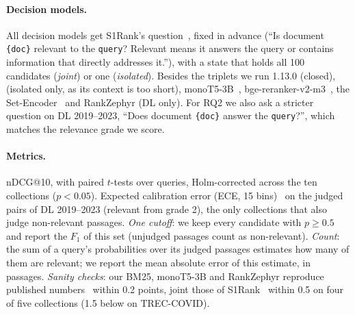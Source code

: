 \paragraph{Decision models.}
All decision models get S1Rank's question~\cite{S1Rank}, fixed in advance (``Is document \texttt{\{doc\}} relevant
to the \texttt{query}? Relevant means it answers the query or contains information that directly addresses it.''),
with a state that holds all 100 candidates (\emph{joint}) or one (\emph{isolated}). Besides the triplets we run
\jev{} 1.13.0 (closed), \laya{}~\cite{Laya} (isolated only, as its context is too short),
monoT5-3B~\cite{Nogueira2020monoT5}, bge-reranker-v2-m3~\cite{Chen2024BGEM3}, the
Set-Encoder~\cite{Schlatt2025SetEncoder} and RankZephyr (DL only). For RQ2 we also ask a stricter question on
DL 2019--2023, ``Does document \texttt{\{doc\}} answer the \texttt{query}?'', which matches the relevance grade we
score.

\paragraph{Metrics.}
nDCG@10, with paired $t$-tests over queries, Holm-corrected across the ten collections ($p < 0.05$). Expected
calibration error (ECE, 15 bins)~\cite{Guo2017Calibration} on the judged pairs of DL 2019--2023 (relevant from grade
2), the only collections that also judge non-relevant passages. \emph{One cutoff}: we keep every candidate with
$p \ge 0.5$ and report the $F_1$ of this set (unjudged passages count as non-relevant). \emph{Count}: the sum of
a query's probabilities over its judged passages estimates how many of them are relevant; we report the mean absolute
error of this estimate, in passages. \emph{Sanity checks}: our BM25, monoT5-3B and
RankZephyr reproduce published numbers~\cite{Pyserini2CR,Abdallah2025HowGood} within 0.2 points, \jev{} joint
those of S1Rank~\cite{S1Rank} within 0.5 on four of five collections (1.5 below on TREC-COVID).
